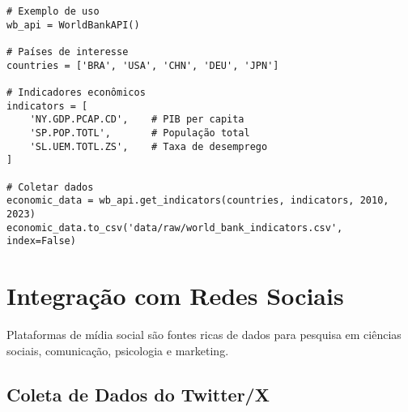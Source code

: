 \begin{researchbox}
\begin{lstlisting}
# Exemplo de uso
wb_api = WorldBankAPI()

# Países de interesse
countries = ['BRA', 'USA', 'CHN', 'DEU', 'JPN']

# Indicadores econômicos
indicators = [
    'NY.GDP.PCAP.CD',    # PIB per capita
    'SP.POP.TOTL',       # População total
    'SL.UEM.TOTL.ZS',    # Taxa de desemprego
]

# Coletar dados
economic_data = wb_api.get_indicators(countries, indicators, 2010, 2023)
economic_data.to_csv('data/raw/world_bank_indicators.csv', index=False)
\end{lstlisting}
\end{researchbox}

\section{Integração com Redes Sociais}

Plataformas de mídia social são fontes ricas de dados para pesquisa em ciências sociais, comunicação, psicologia e marketing.

\subsection{Coleta de Dados do Twitter/X}

